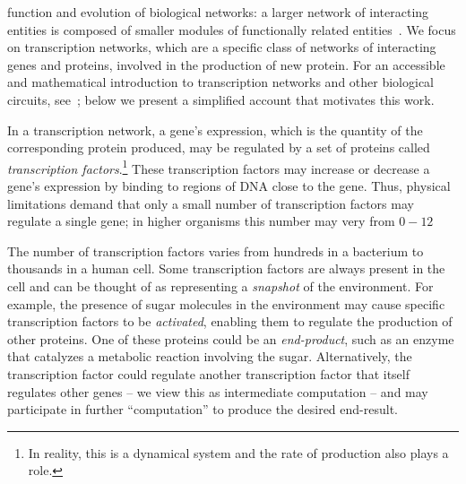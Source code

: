 function and evolution of biological networks:
a larger network of interacting entities is composed of smaller modules of
functionally related entities~\cite{Hartwell:1999}.
We focus on transcription networks, which are a specific class of
networks of interacting genes and proteins, involved in the production of new
protein. For an accessible and mathematical introduction to transcription
networks and other biological circuits, see~\cite{Alon:2006}; below we present a
simplified account that motivates this work.


In a transcription network, a gene's expression, which is the quantity of the
corresponding protein produced, may be regulated by a set of proteins called
\emph{transcription factors}.\footnote{In reality, this is a dynamical system
and the rate of production also plays a role.} These transcription factors
may increase or decrease a gene's expression by binding to regions of DNA close to
the gene. Thus, physical limitations demand that only a small number of
transcription factors may regulate a single gene; in higher organisms this
number may very from $0-12$~

The number of transcription factors varies from hundreds in a bacterium to
thousands in a human cell. Some transcription factors are always present in the
cell and can be thought of as representing a \emph{snapshot} of the environment.
For example, the presence of sugar molecules in the environment may cause specific
transcription factors to be \emph{activated}, enabling them to regulate
the production of other proteins.  One of these proteins could be an
\emph{end-product}, such as an enzyme that catalyzes a metabolic reaction
involving the sugar. Alternatively, the transcription factor could regulate
another transcription factor that itself
regulates other genes -- we view this as intermediate computation -- and may
participate in further ``computation'' to produce the desired end-result.

